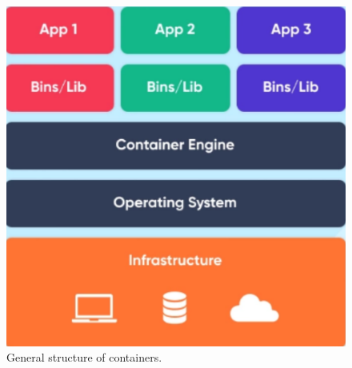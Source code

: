 \begin{figure}[htbp]
    \centering
    \includegraphics[width=0.445\linewidth]{figures/containers.png}
    \caption{General structure of containers.}
    \label{fig:Containers}
\end{figure}